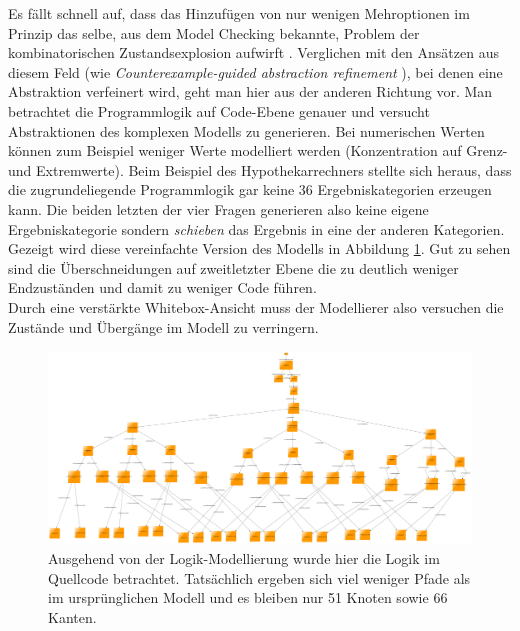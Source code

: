 Es fällt schnell auf, dass das Hinzufügen von nur wenigen Mehroptionen im Prinzip das selbe, aus dem Model Checking bekannte, Problem der kombinatorischen Zustandsexplosion aufwirft \cite{clarke_model_2012}. Verglichen mit den Ansätzen aus diesem Feld (wie \textit{Counterexample-guided abstraction refinement} \cite{clarke_counterexample-guided_2000}), bei denen eine Abstraktion verfeinert wird, geht man hier aus der anderen Richtung vor. Man betrachtet die Programmlogik auf Code-Ebene genauer und versucht Abstraktionen des komplexen Modells zu generieren. Bei numerischen Werten können zum Beispiel weniger Werte modelliert werden (Konzentration auf Grenz- und Extremwerte). Beim Beispiel des Hypothekarrechners stellte sich heraus, dass die zugrundeliegende Programmlogik gar keine 36 Ergebniskategorien erzeugen kann. Die beiden letzten der vier Fragen generieren also keine eigene Ergebniskategorie sondern \textit{schieben} das Ergebnis in eine der anderen Kategorien. Gezeigt wird diese vereinfachte Version des Modells in Abbildung \ref{fig:modell_logisch}. Gut zu sehen sind die Überschneidungen auf zweitletzter Ebene die zu deutlich weniger Endzuständen und damit zu weniger Code führen.\\
Durch eine verstärkte Whitebox-Ansicht muss der Modellierer also versuchen die  Zustände und Übergänge im Modell zu verringern.


\begin{figure}[h] 
  \centering
     \includegraphics[width=1.5\textwidth, angle=90]{figures/modell_logisch.png}
  \caption{Ausgehend von der Logik-Modellierung wurde hier die Logik im Quellcode betrachtet. Tatsächlich ergeben sich viel weniger Pfade als im ursprünglichen Modell und es bleiben nur 51 Knoten sowie 66 Kanten.}
  \label{fig:modell_logisch}
\end{figure}

